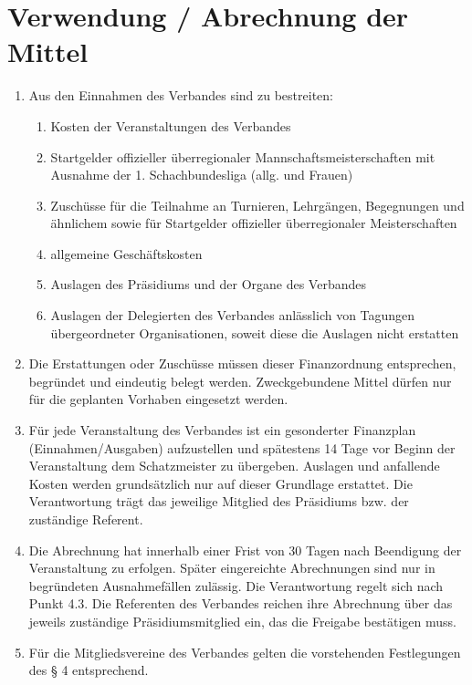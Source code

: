 \documentclass[fontsize=12pt, paper=a4, ngerman]{article}
\begin{document}
\section{Verwendung / Abrechnung der Mittel}
\begin{enumerate}
\item Aus den Einnahmen des Verbandes sind zu bestreiten:
  \begin{enumerate}[label=-]
  \item Kosten der Veranstaltungen des Verbandes
  \item Startgelder offizieller überregionaler Mannschaftsmeisterschaften mit Ausnahme der 1. Schachbundesliga (allg. und Frauen)
  \item Zuschüsse für die Teilnahme an Turnieren, Lehrgängen, Begegnungen und ähnlichem sowie für Startgelder
  offizieller überregionaler Meisterschaften
  \item allgemeine Geschäftskosten
  \item Auslagen des Präsidiums und der Organe des Verbandes
  \item Auslagen der Delegierten des Verbandes anlässlich von Tagungen übergeordneter Organisationen, soweit diese die Auslagen
  nicht erstatten
  \end{enumerate}
\item Die Erstattungen oder Zuschüsse müssen dieser Finanzordnung entsprechen, begründet
und eindeutig belegt werden. Zweckgebundene Mittel dürfen nur für die geplanten
Vorhaben eingesetzt werden.
\item Für jede Veranstaltung des Verbandes ist ein gesonderter Finanzplan
(Einnahmen/Ausgaben) aufzustellen und spätestens 14 Tage vor Beginn der Veranstaltung
dem Schatzmeister zu übergeben. Auslagen und anfallende Kosten werden grundsätzlich
nur auf dieser Grundlage erstattet. Die Verantwortung trägt das jeweilige Mitglied des
Präsidiums bzw. der zuständige Referent.
\item Die Abrechnung hat innerhalb einer Frist von 30 Tagen nach Beendigung der Veranstaltung
zu erfolgen. Später eingereichte Abrechnungen sind nur in begründeten Ausnahmefällen
zulässig. Die Verantwortung regelt sich nach Punkt 4.3. Die Referenten des Verbandes
reichen ihre Abrechnung über das jeweils zuständige Präsidiumsmitglied ein, das die Freigabe bestätigen muss.
\item Für die Mitgliedsvereine des Verbandes gelten die vorstehenden Festlegungen des § 4 entsprechend.
\end{enumerate}
\end{document}
